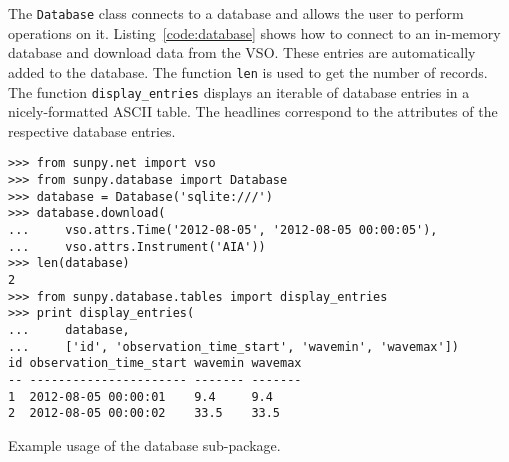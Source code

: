 The \texttt{Database} class connects to a database and allows the user to 
perform operations on it. Listing~\ref{code:database} shows how to connect
to an in-memory database and download data from the \textsc{VSO}. These entries are
automatically added to the database. The function \texttt{len} is used to get the number of
records. The function \texttt{display\_entries} displays an iterable of 
database entries in a nicely-formatted \textsc{ASCII} table. The headlines 
correspond to the attributes of the respective database entries.

\begin{listing}[H]
\begin{verbatim}
>>> from sunpy.net import vso
>>> from sunpy.database import Database
>>> database = Database('sqlite:///')
>>> database.download(
...     vso.attrs.Time('2012-08-05', '2012-08-05 00:00:05'),
...     vso.attrs.Instrument('AIA'))
>>> len(database)
2
>>> from sunpy.database.tables import display_entries
>>> print display_entries(
...     database,
...     ['id', 'observation_time_start', 'wavemin', 'wavemax'])
id observation_time_start wavemin wavemax
-- ---------------------- ------- -------
1  2012-08-05 00:00:01    9.4     9.4    
2  2012-08-05 00:00:02    33.5    33.5   
\end{verbatim}
\caption{Example usage of the database sub-package.}
\label{code:database}
\end{listing}

